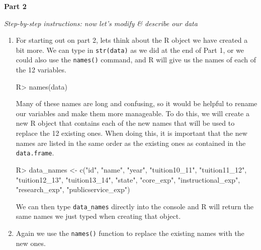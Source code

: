 \documentclass{article}
\newenvironment{Schunk}{}{}
\newcommand{\code}[1]{\texttt{#1}}
\newcommand{\proglang}[1]{\textsf{#1}}
\begin{document}
{\begin{enumerate}[leftmargin=15mm]
\begin{enumerate}[label=\Alph*.  ]
\end{enumerate}

\end{enumerate}


\setlength{\leftskip}{0cm}

\large{\textbf{Part 2}}

\vspace{4mm}
\setlength{\leftskip}{1cm}
\textit{Step-by-step instructions: now let's modify \& describe our data}

\begin{enumerate}[leftmargin=15mm]

\item For starting out on part 2, lets think about the \proglang{R} object we have created a bit more.  We can type in \code{str(data)} as we did at the end of Part 1, or we could also use the \code{names()} command, and \proglang{R} will give us the names of each of the 12 variables.

\begin{Schunk}
\begin{Sinput}

R> names(data)

\end{Sinput}
\end{Schunk}

Many of these names are long and confusing, so it would be helpful to rename our variables and make them more manageable.  To do this, we will create a new \proglang{R} object that contains each of the new names that will be used to replace the 12 existing ones.  When doing this, it is important that the new names are listed in the same order as the existing ones as contained in the \code{data.frame}.

\begin{Schunk}
\begin{Sinput}

R> data_names <- c("id", "name", "year", "tuition10_11", 
"tuition11_12", "tuition12_13", "tuition13_14", "state", 
"core_exp", "instructional_exp", "research_exp", 
"publicservice_exp")

\end{Sinput}
\end{Schunk}

We can then type \code{data\_names} directly into the console and \proglang{R} will return the same names we just typed when creating that object.

\item Again we use the \code{names()} function to replace the existing names with the new ones.


\end{enumerate}}
\end{document}
